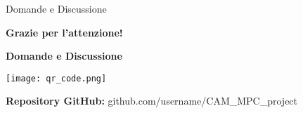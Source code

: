 \documentclass[beamer]{beamer}
\begin{document}
\begin{frame}{Domande e Discussione}
    \begin{center}
        \Huge \textbf{Grazie per l'attenzione!}
        
        \vspace{1cm}
        \Large \textbf{Domande e Discussione}
        
        \vspace{1cm}
        \texttt{[image: qr\_code.png]}
        
        \vspace{0.5cm}
        \small \textbf{Repository GitHub:} github.com/username/CAM\_MPC\_project
    \end{center}
\end{frame}
\end{document}
